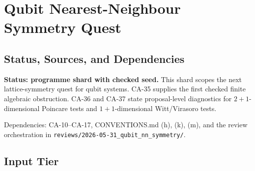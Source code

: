 
\section{Qubit Nearest-Neighbour Symmetry Quest}
\label{sec:qubit-nearest-neighbour-symmetry-quest}

\subsection{Status, Sources, and Dependencies}

\textbf{Status: programme shard with checked seed.}  This shard scopes the next
lattice-symmetry quest for qubit systems.  CA-35 supplies the first checked
finite algebraic obstruction.  CA-36 and CA-37 state proposal-level diagnostics
for \(2+1\)-dimensional Poincare tests and \(1+1\)-dimensional
Witt/Virasoro tests.

Dependencies: CA-10--CA-17, CONVENTIONS.md (h), (k), (m), and the review
orchestration in \texttt{reviews/2026-05-31\_qubit\_nn\_symmetry/}.


\subsection{Input Tier}

